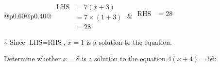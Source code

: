 \documentclass[12pt]{article}
\newcounter{minipagecount}
\begin{document}
\begin{multicols}{2}
\begin{minipage}[t]{0.40\textwidth}
    \renewcommand{\arraystretch}{1.3} %
    \begin{tabular}{@{}p{0.60\linewidth}@{}p{0.40\linewidth}@{}}
        \(\begin{aligned}
            \text{LHS} &= 7(x + 3) \\
                    &= 7 \times(1 + 3) \\
                    &= 28
        \end{aligned}\) &
        \(\begin{aligned}
            \text{RHS} &= 28\\
                    & \\
                    &
        \end{aligned}\)
    \end{tabular}
    \renewcommand{\arraystretch}{1.0} %
    \vspace{2pt}  %

    \noindent \(\therefore\) Since \(\text{LHS} = \text{RHS}\), \(x = 1\) is  a solution to the equation.

\end{minipage}

 \vspace*{16pt}
\noindent{(\theminipagecount)}\hspace{0.1mm} %
\begin{minipage}[t]{0.40\textwidth} %

    \noindent Determine whether \(x = 8\) is a solution to the equation \(4(x + 4) = 56\):
    \vspace{4pt}  %

    \noindent


\end{minipage}
\end{multicols}
\end{document}
